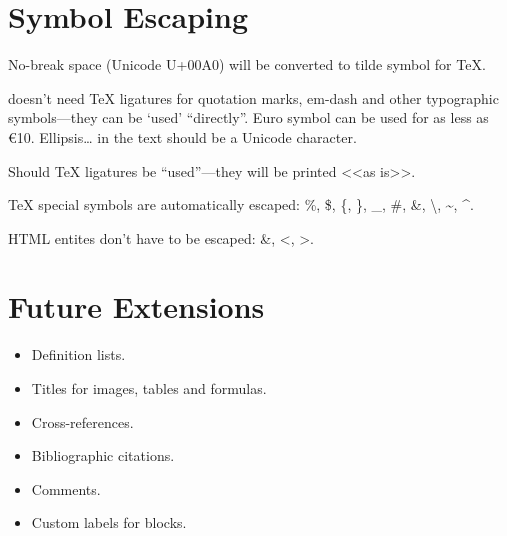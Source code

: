 \documentclass[10pt]{article}
\begin{document}
\section{Symbol Escaping}

No-break space (Unicode U+00A0) will be converted to tilde symbol for TeX.

\XeTeX{} doesn't need \TeX{} ligatures for quotation marks, em-dash and other
typographic symbols—they can be ‘used’ “directly”. Euro symbol can be used for
as less as €10. Ellipsis… in the text should be a Unicode character.

Should \TeX{} ligatures be ``used''—they will be printed <<as is>>.

\TeX{} special symbols are automatically escaped: \%, \$, \{, \}, \_, \#,
\&, \textbackslash, \textasciitilde, \textasciicircum.

HTML entites don't have to be escaped: \&, <, >.

\section{Future Extensions}

\begin{itemize}

\item Definition lists.

\item Titles for images, tables and formulas.

\item Cross-references.

\item Bibliographic citations.

\item Comments.

\item Custom labels for blocks.

\end{itemize}
\end{document}
